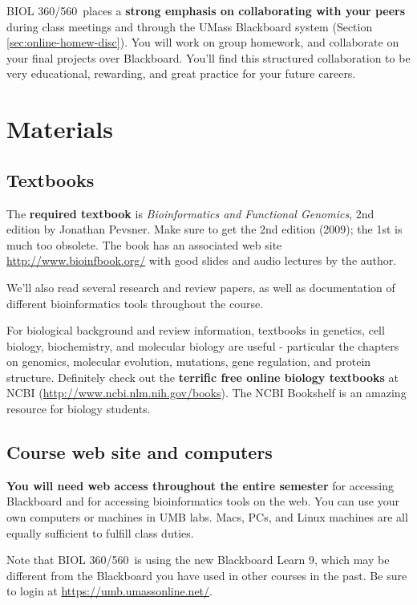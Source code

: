 \documentclass[12pt]{article}
\newcommand{\course}{BIOL 360/560}
\begin{document}
\course\ places a \textbf{strong emphasis on collaborating with your peers}
during class meetings and through the UMass Blackboard system (Section
\ref{sec:online-homew-disc}).  You will work on group homework, and collaborate
on your final projects over Blackboard.  You'll find this structured
collaboration to be very educational, rewarding, and great practice for your
future careers.


\section{Materials}
\label{sec:materials}

\subsection{Textbooks}
\label{sec:textbooks}

The \textbf{required textbook} is \textit{Bioinformatics and
  Functional Genomics}, {2nd edition} by Jonathan Pevsner.  Make
sure to get the 2nd edition (2009); the 1st is much too obsolete.  The book has
an associated web site \url{http://www.bioinfbook.org/} with good slides and
audio lectures by the author.


We'll also read several research and review papers, as well as documentation of
different bioinformatics tools throughout the course.


For biological background and review information, textbooks in genetics, cell
biology, biochemistry, and molecular biology are useful - particular
the chapters on genomics, molecular evolution, mutations, gene
regulation, and protein structure.  Definitely check out the
\textbf{terrific free online biology textbooks} at NCBI
(\url{http://www.ncbi.nlm.nih.gov/books}).  The NCBI
Bookshelf is an amazing resource for biology students.

\subsection{Course web site and computers}
\label{sec:course-web-site}

\textbf{You will need web access throughout the entire semester} for
accessing Blackboard and for accessing bioinformatics tools on the web.  You can
use your own computers or machines in UMB labs.  Macs, PCs, and Linux machines
are all equally sufficient to fulfill class duties.


Note that \course\ is using the new Blackboard Learn 9, which may be different from
the Blackboard you have used in other courses in the past.  Be sure to login at
\url{https://umb.umassonline.net/}.
\end{document}
